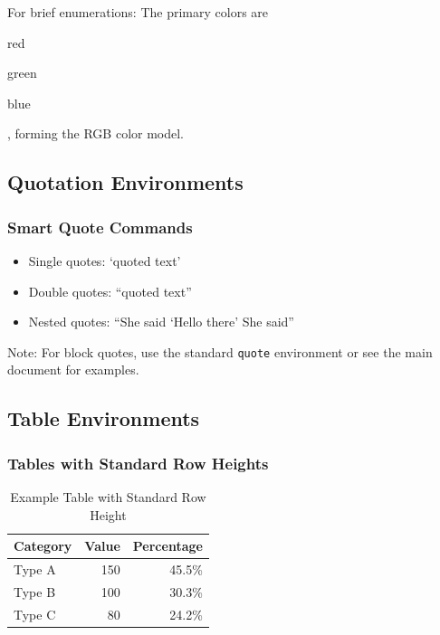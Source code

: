 For brief enumerations:
The primary colors are \begin{inlineitem}\item red\item green\item blue\end{inlineitem}, forming the RGB color model.

\subsection{Quotation Environments}

\subsubsection{Smart Quote Commands}

\begin{itemize}
\item Single quotes: `quoted text'
\item Double quotes: ``quoted text''
\item Nested quotes: ``She said `Hello there' She said''
\end{itemize}

Note: For block quotes, use the standard \texttt{quote} environment or see the main document for examples.

\subsection{Table Environments}

\subsubsection{Tables with Standard Row Heights}

\begin{table}[h]
  \renewcommand{\arraystretch}{1.2}
  \caption{Example Table with Standard Row Height}
  \centering
  \begin{tabular}{@{}lrr@{}}
    \toprule
    Category & Value & Percentage \\
    \midrule
    Type A & 150 & 45.5\% \\
    Type B & 100 & 30.3\% \\
    Type C & 80 & 24.2\% \\
    \bottomrule
  \end{tabular}
\end{table}

